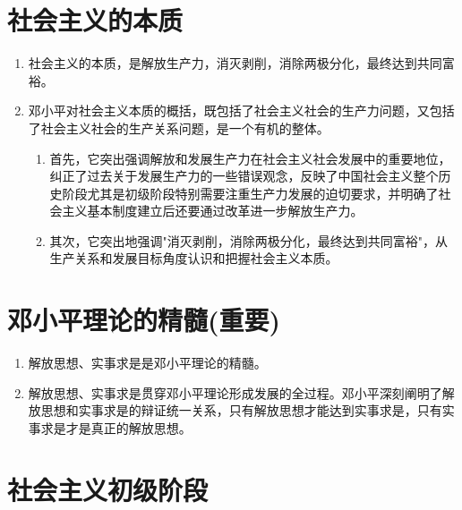 \documentclass[12pt, a4paper, oneside]{ctexbook}
\begin{document}
\section{社会主义的本质}

\begin{enumerate}[label=（\arabic*）]
\item 社会主义的本质，是解放生产力，消灭剥削，消除两极分化，最终达到共同富裕。

\item 邓小平对社会主义本质的概括，既包括了社会主义社会的生产力问题，又包括了社会主义社会的生产关系问题，是一个有机的整体。

\begin{enumerate}[label=（\roman*）]
\item 首先，它突出强调解放和发展生产力在社会主义社会发展中的重要地位，纠正了过去关于发展生产力的一些错误观念，反映了中国社会主义整个历史阶段尤其是初级阶段特别需要注重生产力发展的迫切要求，并明确了社会主义基本制度建立后还要通过改革进一步解放生产力。

\item 其次，它突出地强调"消灭剥削，消除两极分化，最终达到共同富裕"，从生产关系和发展目标角度认识和把握社会主义本质。
\end{enumerate}
\end{enumerate}

\section{邓小平理论的精髓(重要)}

\begin{enumerate}[label=（\arabic*）]
\item 解放思想、实事求是是邓小平理论的精髓。

\item 解放思想、实事求是贯穿邓小平理论形成发展的全过程。邓小平深刻阐明了解放思想和实事求是的辩证统一关系，只有解放思想才能达到实事求是，只有实事求是才是真正的解放思想。
\end{enumerate}

\section{社会主义初级阶段}
\end{document}
